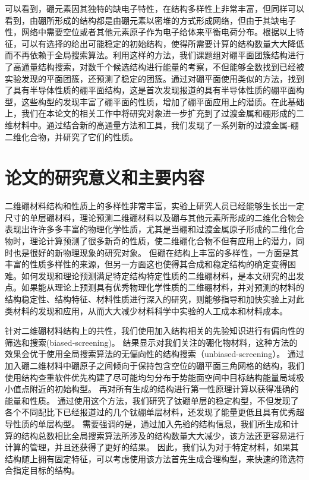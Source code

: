 可以看到，硼元素因其独特的缺电子特性，在结构多样性上非常丰富，但同样可以看到，由硼所形成的结构都是由硼元素以密堆的方式形成网络，但由于其缺电子性，网络中需要空位或者其他元素原子作为电子给体来平衡电荷分布。根据以上特征，可以有选择的给出可能稳定的初始结构，使得所需要计算的结构数量大大降低而不再依赖于全局搜索算法。利用这样的方法，我们课题组对硼平面团簇结构进行了高通量结构搜索，对数千个候选结构进行能量的考察，不但能够全数找到已经被实验发现的平面团簇，还预测了稳定的团簇\cite{xu2017practical}。通过对硼平面使用类似的方法，找到了具有半导体性质的硼平面结构\cite{xu2017two}，这是首次发现报道的具有半导体性质的硼平面构型，这些构型的发现丰富了硼平面的性质，增加了硼平面应用上的潜质。在此基础上，我们在本论文的相关工作中将研究对象进一步扩充到了过渡金属和硼形成的二维材料中。通过结合新的高通量方法和工具，我们发现了一系列新的过渡金属-硼二维化合物，并研究了它们的性质。

\section{论文的研究意义和主要内容}
二维硼材料结构和性质上的多样性非常丰富，实验上研究人员已经能够生长出一定尺寸的单层硼材料，理论预测二维硼材料以及硼与其他元素所形成的二维化合物会表现出许许多多丰富的物理化学性质，尤其是当硼和过渡金属原子形成的二维化合物时，理论计算预测了很多新奇的性质，使二维硼化合物不但有应用上的潜力，同时也是很好的新物理现象的研究对象。
但硼在结构上丰富的多样性，一方面是其丰富的性质多样性的来源，但另一方面这也使得其合成和稳定结构的确定变得困难。如何发现和理论预测满足特定结构特定性质的二维硼材料，是本文研究的出发点。如果能从理论上预测具有优秀物理化学性质的二维硼材料，并对预测的材料的结构稳定性、结构特征、材料性质进行深入的研究，则能够指导和加快实验上对此类材料的发现和应用，从而大大减少材料科学中实验的人工成本和材料成本。

针对二维硼材料结构上的共性，我们使用加入结构相关的先验知识进行有偏向性的筛选和搜索(biased-screening)。
结果显示对我们关注的硼化物材料，这种方法的效果会优于使用全局搜索算法的无偏向性的结构搜索（unbiased-screening）。
通过加入硼二维材料中硼原子之间倾向于保持包含空位的硼平面三角网格的结构，我们使用结构查重软件优先构建了尽可能均匀分布于势能面空间中目标结构能量局域极小值点附近的初始构型。
再对所有生成的结构进行第一性原理计算以获得准确的能量和性质。
通过使用这个方法，我们研究了钛硼单层的稳定构型，不但发现了各个不同配比下已经报道过的几个钛硼单层材料，还发现了能量更低且具有优秀超导性质的单层构型。
需要强调的是，通过加入先验的结构信息，我们所生成和计算的结构总数相比全局搜索算法所涉及的结构数量大大减少，该方法还更容易进行计算的管理，并且还获得了更好的结果。
因此，我们认为对于特定材料，如果其结构随上拥有固定特征，可以考虑使用该方法首先生成合理构型，来快速的筛选符合指定目标的结构。

